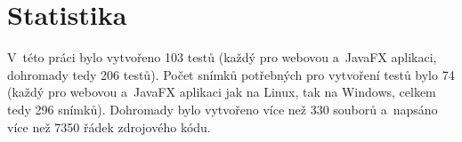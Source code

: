 \chapter{Statistika}
V~této práci bylo vytvořeno 103 testů (každý pro webovou a~JavaFX aplikaci, dohromady tedy 206 testů). Počet snímků potřebných pro vytvoření testů bylo 74 (každý pro webovou a~JavaFX aplikaci jak na Linux, tak na Windows, celkem tedy 296 snímků). Dohromady bylo vytvořeno více než 330 souborů a~napsáno více než 7350 řádek zdrojového kódu.